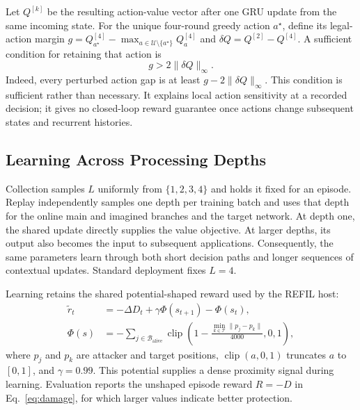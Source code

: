 Let $Q^{[k]}$ be the resulting action-value vector after one GRU update from the same incoming state. For the unique four-round greedy action $a^\star$, define its legal-action margin $g=Q^{[4]}_{a^\star}-\max_{a\in\mathcal U\setminus\{a^\star\}}Q^{[4]}_a$ and $\delta Q=Q^{[2]}-Q^{[4]}$. A sufficient condition for retaining that action is
\begin{equation}
 g>2\|\delta Q\|_\infty.
 \label{eq:greedy-stability}
\end{equation}
Indeed, every perturbed action gap is at least $g-2\|\delta Q\|_\infty$. This condition is sufficient rather than necessary. It explains local action sensitivity at a recorded decision; it gives no closed-loop reward guarantee once actions change subsequent states and recurrent histories.

\subsection{Learning Across Processing Depths}
Collection samples $L$ uniformly from $\{1,2,3,4\}$ and holds it fixed for an episode. Replay independently samples one depth per training batch and uses that depth for the online main and imagined branches and the target network. At depth one, the shared update directly supplies the value objective. At larger depths, its output also becomes the input to subsequent applications. Consequently, the same parameters learn through both short decision paths and longer sequences of contextual updates. Standard deployment fixes $L=4$.

Learning retains the shared potential-shaped reward used by the REFIL host:
\begin{align}
 \widetilde r_t&=-\Delta D_t+\gamma\Phi(s_{t+1})-\Phi(s_t),\nonumber\\
 \Phi(s)&=-\sum_{j\in\mathcal B_{\mathrm{alive}}}
 \operatorname{clip}\!\left(1-\frac{\min_{k\in\mathcal T}\|p_j-p_k\|}{4000},0,1\right),
 \label{eq:shaping}
\end{align}
where $p_j$ and $p_k$ are attacker and target positions, $\operatorname{clip}(a,0,1)$ truncates $a$ to $[0,1]$, and $\gamma=0.99$. This potential supplies a dense proximity signal during learning. Evaluation reports the unshaped episode reward $R=-D$ in Eq.~\eqref{eq:damage}, for which larger values indicate better protection.


